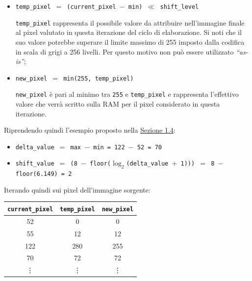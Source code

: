 \documentclass{article}
\begin{document}
\begin{itemize}
    \item   \texttt{temp\_pixel $=$ (current\_pixel $-$ min) $\ll$ shift\_level}\par
          \texttt{temp\_pixel} rappresenta il possibile valore da attribuire nell’immagine finale al pixel valutato in questa iterazione del ciclo di elaborazione. Si noti che il suo valore potrebbe superare il limite massimo di 255 imposto dalla codifica in scala di grigi a 256 livelli. Per questo motivo non può essere utilizzato \emph{“as-is”};
    \item   \texttt{new\_pixel $=$ min(255, temp\_pixel)}\par
          \texttt{new\_pixel} è pari al minimo tra \texttt{255} e \texttt{temp\_pixel} e rappresenta l’effettivo valore che verrà scritto sulla RAM per il pixel considerato in questa iterazione.
\end{itemize}

Riprendendo quindi l'esempio proposto nella \hyperref[sec:esempio]{Sezione 1.4}:
\begin{itemize}
    \item   \texttt{delta\_value $=$ max $-$ min = 122 $-$ 52 = 70}
    \item   \texttt{shift\_value $=$ (8 $-$ floor($\log_{2} $(delta\_value $+$ 1))) $=$ 8 $-$ floor(6.149) = 2}
\end{itemize}

Iterando quindi sui pixel dell'immagine sorgente:
\vspace{-.1cm}
\begin{center}
    \small
    \def\arraystretch{1.2} %
    \begin{tabular}{||c|c|c||}
        \hline
        \texttt{current\_pixel} & \texttt{temp\_pixel} & \texttt{new\_pixel} \\
        \hline \hline
        52                      & 0                    & 0                   \\\hline
        55                      & 12                   & 12                  \\\hline
        122                     & 280                  & 255                 \\\hline
        70                      & 72                   & 72                  \\\hline
        \vdots                  & \vdots               & \vdots              \\\hline
    \end{tabular}
\end{center}
\vspace{.1cm}
\end{document}
